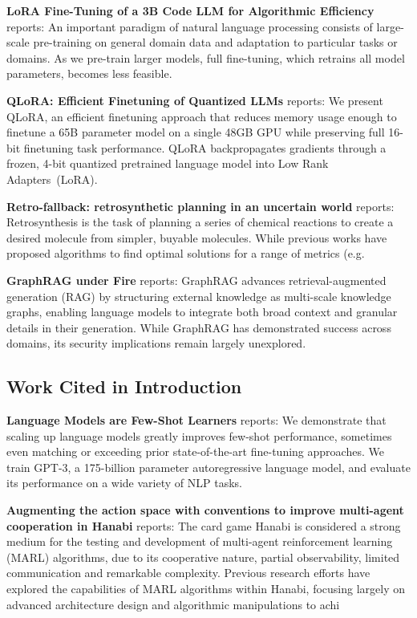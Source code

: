\documentclass[11pt,a4paper]{article}
\begin{document}
\textbf{LoRA Fine-Tuning of a 3B Code LLM for Algorithmic Efficiency} \cite{crossref_10_48550_arxiv_2106_09685} reports: An important paradigm of natural language processing consists of large-scale pre-training on general domain data and adaptation to particular tasks or domains. As we pre-train larger models, full fine-tuning, which retrains all model parameters, becomes less feasible.

\textbf{QLoRA: Efficient Finetuning of Quantized LLMs} \cite{crossref_10_48550_arxiv_2305_14314} reports: We present QLoRA, an efficient finetuning approach that reduces memory usage enough to finetune a 65B parameter model on a single 48GB GPU while preserving full 16-bit finetuning task performance. QLoRA backpropagates gradients through a frozen, 4-bit quantized pretrained language model into Low Rank Adapters~(LoRA).

\textbf{Retro-fallback: retrosynthetic planning in an uncertain world} \cite{arxiv_2310_09270} reports: Retrosynthesis is the task of planning a series of chemical reactions to create a desired molecule from simpler, buyable molecules. While previous works have proposed algorithms to find optimal solutions for a range of metrics (e.g.

\textbf{GraphRAG under Fire} \cite{arxiv_2501_14050} reports: GraphRAG advances retrieval-augmented generation (RAG) by structuring external knowledge as multi-scale knowledge graphs, enabling language models to integrate both broad context and granular details in their generation. While GraphRAG has demonstrated success across domains, its security implications remain largely unexplored.


\subsection{Work Cited in Introduction}


\textbf{Language Models are Few-Shot Learners} \cite{arxiv_2005_14165} reports: We demonstrate that scaling up language models greatly improves few-shot performance, sometimes even matching or exceeding prior state-of-the-art fine-tuning approaches. We train GPT-3, a 175-billion parameter autoregressive language model, and evaluate its performance on a wide variety of NLP tasks.

\textbf{Augmenting the action space with conventions to improve multi-agent cooperation in Hanabi} \cite{arxiv_2412_06333} reports: The card game Hanabi is considered a strong medium for the testing and development of multi-agent reinforcement learning (MARL) algorithms, due to its cooperative nature, partial observability, limited communication and remarkable complexity. Previous research efforts have explored the capabilities of MARL algorithms within Hanabi, focusing largely on advanced architecture design and algorithmic manipulations to achi
\end{document}
